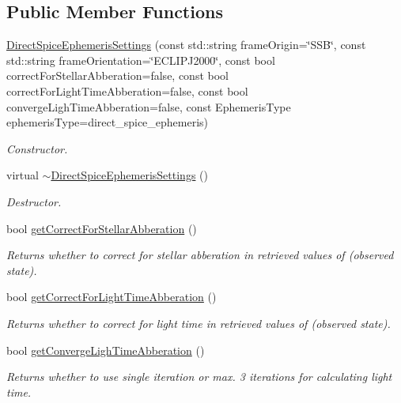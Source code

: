 \subsection*{Public Member Functions}
\begin{DoxyCompactItemize}
\item 
\hyperlink{classtudat_1_1simulation__setup_1_1DirectSpiceEphemerisSettings_a6c164043a6e766237e687532c7833647}{Direct\+Spice\+Ephemeris\+Settings} (const std\+::string frame\+Origin=\char`\"{}S\+SB\char`\"{}, const std\+::string frame\+Orientation=\char`\"{}E\+C\+L\+I\+P\+J2000\char`\"{}, const bool correct\+For\+Stellar\+Abberation=false, const bool correct\+For\+Light\+Time\+Abberation=false, const bool converge\+Ligh\+Time\+Abberation=false, const Ephemeris\+Type ephemeris\+Type=direct\+\_\+spice\+\_\+ephemeris)
\begin{DoxyCompactList}\small\item\em Constructor. \end{DoxyCompactList}\item 
virtual \hyperlink{classtudat_1_1simulation__setup_1_1DirectSpiceEphemerisSettings_a1193509dbad3b84f024fc5a8c6c3bbb0}{$\sim$\+Direct\+Spice\+Ephemeris\+Settings} ()\hypertarget{classtudat_1_1simulation__setup_1_1DirectSpiceEphemerisSettings_a1193509dbad3b84f024fc5a8c6c3bbb0}{}\label{classtudat_1_1simulation__setup_1_1DirectSpiceEphemerisSettings_a1193509dbad3b84f024fc5a8c6c3bbb0}

\begin{DoxyCompactList}\small\item\em Destructor. \end{DoxyCompactList}\item 
bool \hyperlink{classtudat_1_1simulation__setup_1_1DirectSpiceEphemerisSettings_a320f26504673413b5d8b293c79e72d90}{get\+Correct\+For\+Stellar\+Abberation} ()
\begin{DoxyCompactList}\small\item\em Returns whether to correct for stellar abberation in retrieved values of (observed state). \end{DoxyCompactList}\item 
bool \hyperlink{classtudat_1_1simulation__setup_1_1DirectSpiceEphemerisSettings_ac9600e77afbdb5642468c2f5263b5bd7}{get\+Correct\+For\+Light\+Time\+Abberation} ()
\begin{DoxyCompactList}\small\item\em Returns whether to correct for light time in retrieved values of (observed state). \end{DoxyCompactList}\item 
bool \hyperlink{classtudat_1_1simulation__setup_1_1DirectSpiceEphemerisSettings_a847cb047b0acbe94c342067e741a9f35}{get\+Converge\+Ligh\+Time\+Abberation} ()
\begin{DoxyCompactList}\small\item\em Returns whether to use single iteration or max. 3 iterations for calculating light time. \end{DoxyCompactList}\end{DoxyCompactItemize}
